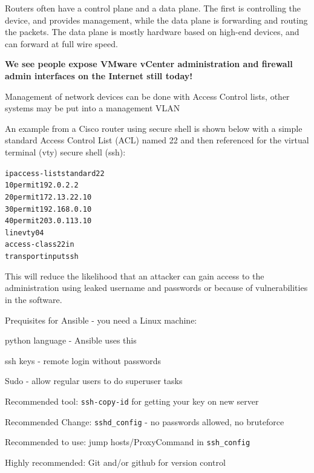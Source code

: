 \documentclass[Screen16to9,17pt]{foils}
\begin{document}


Routers often have a control plane and a data plane. The first is controlling the device, and provides management, while the data plane is forwarding and routing the packets. The data plane is mostly hardware based on high-end devices, and can forward at full wire speed.

{\bf We see people expose VMware vCenter administration and firewall admin interfaces on the Internet still today!}



Management of network devices can be done with Access Control lists, other systems may be put into a management VLAN

An example from a Cisco router using secure shell is shown below with a simple standard Access Control List (ACL) named 22 and then referenced for the virtual terminal (vty) secure shell (ssh):

\begin{alltt}\scriptsize
ip access-list standard 22
10 permit 192.0.2.2
20 permit 172.13.22.10
30 permit 192.168.0.10
40 permit 203.0.113.10
line vty 0 4
  access-class 22 in
  transport input ssh
\end{alltt}

This will reduce the likelihood that an attacker can gain access to the administration using leaked username and passwords or because of vulnerabilities in the software.


Prequisites for Ansible - you need a Linux machine:
\begin{list2}
\item python language - Ansible uses this
\item ssh keys - remote login without passwords
\item Sudo - allow regular users to do superuser tasks
\item Recommended tool: \verb+ssh-copy-id+ for getting your key on new server
\item Recommended Change: \verb+sshd_config+ - no passwords allowed, no bruteforce
\item Recommended to use: jump hosts/ProxyCommand in \verb+ssh_config+
\item Highly recommended: Git and/or github for version control
\end{list2}
\end{document}
